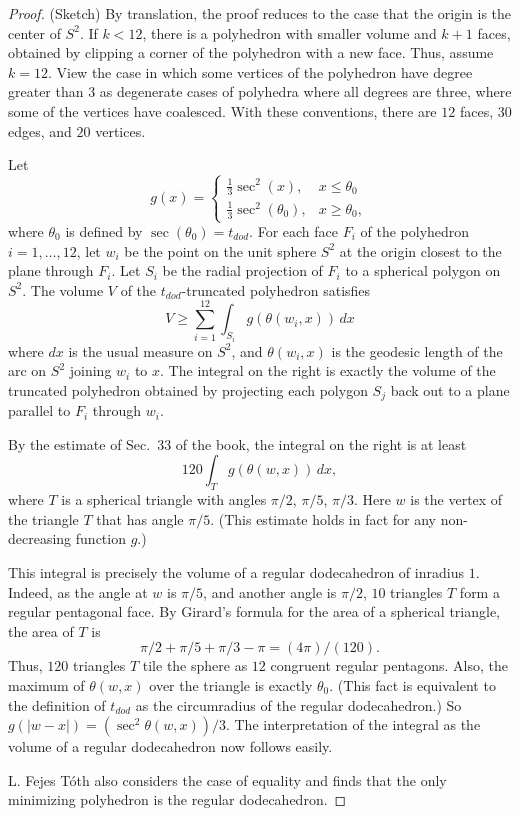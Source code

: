 \begin{proof} (Sketch)  By translation, the proof reduces to
the case that the origin is the center of $S^2$.
If $k<12$, there is a polyhedron with smaller volume and $k+1$ faces,
obtained by clipping a corner of the polyhedron with a new face.
Thus, assume $k=12$.  
View the case in which some vertices of the polyhedron
have degree greater than $3$ as degenerate cases of polyhedra 
where all degrees are three, where some of the vertices have
coalesced.   With these conventions, 
there are $12$ faces, $30$ edges,
and $20$ vertices.

Let 
  $$g(x) = \begin{cases}
          \frac13 \sec^2 (x), & x \le \theta_0\\
          \frac13 \sec^2 (\theta_0), & x \ge \theta_0,
          \end{cases}
   $$
where $\theta_0$ is defined by $\sec(\theta_0) = t_{dod}$.
For each face $F_i$ of the polyhedron $i=1,\ldots, 12$, 
let $w_i$ be the point 
on the unit sphere $S^2$ at the origin closest to the plane through $F_i$.
Let $S_i$ be the radial projection of $F_i$ to a spherical polygon
on $S^2$.   The volume $V$ of the $t_{dod}$-truncated polyhedron satisfies
    $$
    V \ge \sum_{i=1}^{12} \int_{S_i} g(\theta(w_i,x))\,dx
    $$
where $dx$ is the usual measure on $S^2$,
and $\theta(w_i,x)$ is the geodesic length of the arc on $S^2$ joining
$w_i$ to $x$. The integral on the
right is exactly the volume of the truncated polyhedron obtained
by projecting each polygon $S_j$ back out to a plane parallel to $F_i$
through $w_i$.

By the estimate of Sec.~33 of the book, 
the integral on the right is at least
   $$
   120 \int_{T} g(\theta(w,x))\, dx,
   $$
where $T$ is a spherical triangle with angles $\pi/2$,
$\pi/5$, $\pi/3$.  Here $w$ is the vertex of the triangle $T$
that has angle $\pi/5$.  (This estimate 
holds in fact for any non-decreasing function $g$.)

This integral is precisely the volume of a regular
dodecahedron of inradius $1$.  Indeed, as the angle at $w$ is $\pi/5$,
and another angle is $\pi/2$, 
$10$ triangles $T$ form a regular pentagonal face.  By Girard's
formula for the area of a spherical triangle, the area of $T$ is
   $$
   \pi/2 + \pi/5 + \pi/3 - \pi = (4\pi)/(120).
   $$
Thus, $120$ triangles $T$ tile the sphere as $12$ congruent
regular pentagons.
Also, the maximum of $\theta(w,x)$ over the triangle is exactly $\theta_0$.  (This fact is equivalent to the definition of $t_{dod}$ as the circumradius of the regular
dodecahedron.)
So $g(|w-x|) = (\sec^2\theta(w,x))/3$. The interpretation of the integral
as the volume of a regular dodecahedron now follows easily.

L. Fejes T\'oth also considers the case of equality and finds that
the only minimizing polyhedron is the regular dodecahedron.
\end{proof}






